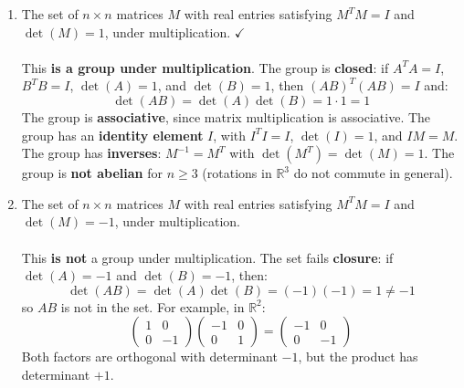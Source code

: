 \documentclass{article}
\begin{document}
\begin{enumerate}
\begin{enumerate}
            \item The set of $n\times n$ matrices $M$ with real entries satisfying $M^TM = I$ and $\det(M) = 1$, under multiplication. $\checkmark$
            \\
            \\ This \textbf{is a group under multiplication}. The group is \textbf{closed}: if $A^TA=I$, $B^TB=I$, $\det(A)=1$, and $\det(B)=1$, then $(AB)^T(AB)=I$ and:
            \[
                \det(AB) = \det(A)\det(B) = 1\cdot 1 = 1
            \]
            The group is \textbf{associative}, since matrix multiplication is associative. The group has an \textbf{identity element} $I$, with $I^TI=I$, $\det(I)=1$, and $IM=M$. The group has \textbf{inverses}: $M^{-1}=M^T$ with $\det(M^T)=\det(M)=1$. The group is \textbf{not abelian} for $n\geq 3$ (rotations in $\mathbb{R}^3$ do not commute in general).
                        \item The set of $n\times n$ matrices $M$ with real entries satisfying $M^TM = I$ and $\det(M) = -1$, under multiplication.
            \\
            \\ This \textbf{is not} a group under multiplication. The set fails \textbf{closure}: if $\det(A) = -1$ and $\det(B) = -1$, then:
            \[
                \det(AB) = \det(A)\det(B) = (-1)(-1) = 1 \neq -1
            \]
            so $AB$ is not in the set. For example, in $\mathbb{R}^2$:
            \[
                \begin{pmatrix}1&0\\0&-1\end{pmatrix}\begin{pmatrix}-1&0\\0&1\end{pmatrix}
                = \begin{pmatrix}-1&0\\0&-1\end{pmatrix}
            \]
            Both factors are orthogonal with determinant $-1$, but the product has determinant $+1$.



\end{enumerate}
\end{enumerate}
\end{document}
